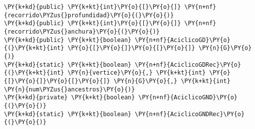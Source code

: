 \begin{Verbatim}[commandchars=\\\{\}]
\PY{k+kd}{public} \PY{k+kt}{int}\PY{o}{[}\PY{o}{]} \PY{n+nf}{recorrido\PYZus{}profundidad}\PY{o}{(}\PY{o}{)}
\PY{k+kd}{public} \PY{k+kt}{int}\PY{o}{[}\PY{o}{]} \PY{n+nf}{recorrido\PYZus{}anchura}\PY{o}{(}\PY{o}{)}
\PY{k+kd}{public} \PY{k+kt}{boolean} \PY{n+nf}{AciclicoGD}\PY{o}{(}\PY{k+kt}{int} \PY{o}{[}\PY{o}{]}\PY{o}{[}\PY{o}{]} \PY{n}{G}\PY{o}{)}
\PY{k+kd}{static} \PY{k+kt}{boolean} \PY{n+nf}{AciclicoGDRec}\PY{o}{(}\PY{k+kt}{int} \PY{n}{vertice}\PY{o}{,} \PY{k+kt}{int} \PY{o}{[}\PY{o}{]}\PY{o}{[}\PY{o}{]} \PY{n}{G}\PY{o}{,} \PY{k+kt}{int} \PY{n}{num\PYZus{}ancestros}\PY{o}{)}
\PY{k+kd}{private} \PY{k+kt}{boolean} \PY{n+nf}{AciclicoGND}\PY{o}{(}\PY{o}{)} 
\PY{k+kd}{static} \PY{k+kt}{boolean} \PY{n+nf}{AciclicoGNDRec}\PY{o}{(}\PY{o}{)}
\end{Verbatim}
